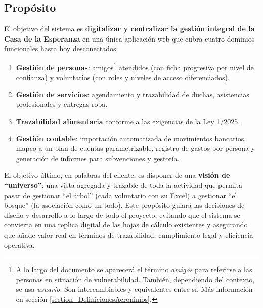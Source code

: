 \subsection{Propósito}
El objetivo del sistema es \textbf{digitalizar y centralizar la gestión integral de
la Casa de la Esperanza} en una única aplicación web que cubra cuatro dominios
funcionales hasta hoy desconectados:
\begin{enumerate}
    \item \textbf{Gestión de personas}: amigos\footnote{A lo largo del documento se aparecerá el término \textit{amigos} para referirse a las personas  en situación de vulnerabilidad. También, dependiendo del contexto, se usa \textit{usuario}. Son intercambiables y equivalentes entre sí. Más información en sección \vref{section_DefinicionesAcronimos}.} %
      atendidos (con ficha progresiva por nivel de confianza) y voluntarios (con roles y niveles de acceso diferenciados).

    \item \textbf{Gestión de servicios}: agendamiento y trazabilidad de duchas, asistencias
       profesionales y entregas ropa.

    \item \textbf{Trazabilidad alimentaria} conforme a las exigencias de la Ley 1/2025.
    
    \item \textbf{Gestión contable}: importación automatizada de movimientos bancarios,
       mapeo a un plan de cuentas parametrizable, registro de gastos por persona
       y generación de informes para subvenciones y gestoría.
\end{enumerate}
\par
\vspace{5mm}
El objetivo último, en palabras del cliente, es disponer de una
\textbf{visión de \enquote{universo}}: una vista agregada y trazable de toda la actividad
que permita pasar de gestionar \enquote{el árbol} (cada voluntario con su Excel) a
gestionar \enquote{el bosque} (la asociación como un todo). Este propósito guiará las
decisiones de diseño y desarrollo a lo largo de todo el proyecto, evitando que
el sistema se convierta en una replica digital de las hojas de cálculo
existentes y asegurando que añade valor real en términos de trazabilidad,
cumplimiento legal y eficiencia operativa.


